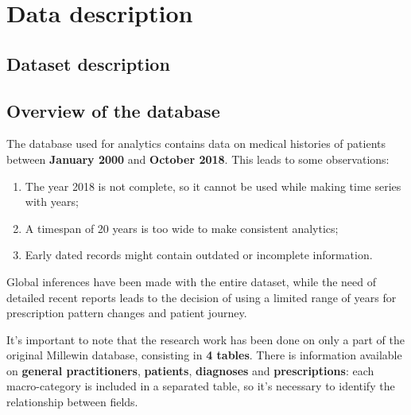 \chapter{Data description}

\section{Dataset description}

\section{Overview of the database}
The database used for analytics contains data on medical histories of patients between \textbf{January 2000} and \textbf{October 2018}. This leads to some observations:
\begin{enumerate}
	\item The year 2018 is not complete, so it cannot be used while making time series with years;
	\item A timespan of 20 years is too wide to make consistent analytics;
	\item Early dated records might contain outdated or incomplete information.
\end{enumerate}

Global inferences have been made with the entire dataset, while the need of detailed recent reports leads to the decision of using a limited range of years for prescription pattern changes and patient journey.

It's important to note that the research work has been done on only a part of the original Millewin database, consisting in \textbf{4 tables}. There is information available on \textbf{general practitioners}, \textbf{patients}, \textbf{diagnoses} and \textbf{prescriptions}: each macro-category is included in a separated table, so it's necessary to identify the relationship between fields.

